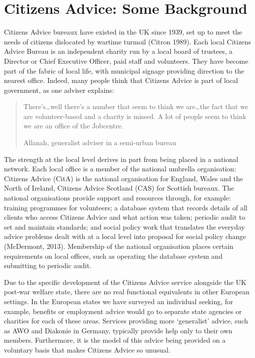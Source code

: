 \chapter{Citizens Advice: Some Background}
Citizens Advice bureaux have existed in the UK since 1939, set up to meet the needs of citizens dislocated by wartime turmoil (Citron 1989).  Each local Citizens Advice Bureau is an independent charity run by a local board of trustees, a Director or Chief Executive Officer, paid staff and volunteers. They have become part of the fabric of local life, with municipal signage providing direction to the nearest office. Indeed, many people think that Citizens Advice is part of local government, as one adviser explains:
    \blockquote[Allanah, generalist adviser in a semi-urban bureau]{There’s…well there’s a number that seem to think we are…the fact that we are volunteer-based and a charity is missed.  A lot of people seem to think we are an office of the Jobcentre.}
\noindent The strength at the local level derives in part from being placed in a national network. Each local office is a member of the national umbrella organisation: Citizens Advice (CitA) is the national organisation for England, Wales and the North of Ireland,%
Citizens Advice Scotland (CAS) for Scottish bureaux. The national organisations provide support and resources through, for example: training programmes for volunteers; a database system that records details of all clients who access Citizens Advice and what action was taken; periodic audit to set and maintain standards; and social policy work that translates the everyday advice problems dealt with at a local level into proposal for social policy change (McDermont, 2013). Membership of the national organisation places certain requirements on local offices, such as operating the database system and submitting to periodic audit.
\par
Due to the specific development of the Citizens Advice service alongside the UK post-war welfare state, there are no real functional equivalents in other European settings. In the European states we have surveyed an individual seeking, for example, benefits or employment advice would go to separate state agencies or charities for each of these areas. Services providing more ‘generalist’ advice, such as AWO and Diakonie in Germany, typically provide help only to their own members. Furthermore, it is the model of this advice being provided on a voluntary basis that makes Citizens Advice so unusual.
